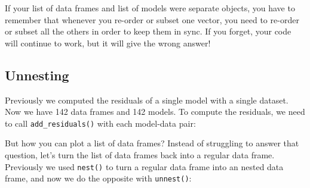 \documentclass[]{book}
\newenvironment{Shaded}{\begin{snugshade}}{\end{snugshade}}
\newcommand{\KeywordTok}[1]{\textcolor[rgb]{0.13,0.29,0.53}{\textbf{{#1}}}}
\newcommand{\DataTypeTok}[1]{\textcolor[rgb]{0.13,0.29,0.53}{{#1}}}
\newcommand{\StringTok}[1]{\textcolor[rgb]{0.31,0.60,0.02}{{#1}}}
\newcommand{\CommentTok}[1]{\textcolor[rgb]{0.56,0.35,0.01}{\textit{{#1}}}}
\newcommand{\NormalTok}[1]{{#1}}
\begin{document}
If your list of data frames and list of models were separate objects,
you have to remember that whenever you re-order or subset one vector,
you need to re-order or subset all the others in order to keep them in
sync. If you forget, your code will continue to work, but it will give
the wrong answer!

\subsection{Unnesting}\label{unnesting}

Previously we computed the residuals of a single model with a single
dataset. Now we have 142 data frames and 142 models. To compute the
residuals, we need to call \texttt{add\_residuals()} with each
model-data pair:

\begin{Shaded}
\end{Shaded}

But how you can plot a list of data frames? Instead of struggling to
answer that question, let's turn the list of data frames back into a
regular data frame. Previously we used \texttt{nest()} to turn a regular
data frame into an nested data frame, and now we do the opposite with
\texttt{unnest()}:
\end{document}

